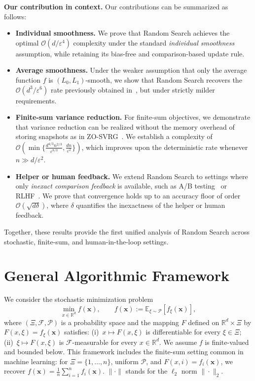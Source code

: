 \documentclass[twoside]{article}
\theoremstyle{plain}
\theoremstyle{definition}
\theoremstyle{remark}
\def\cO{{\mathcal{O}}}
\def\vx{{\bm{x}}}
\begin{document}
\textbf{Our contribution in context.}  
Our contributions can be summarized as follows:  
\begin{itemize}\setlength{\itemsep}{2pt}\setlength{\parskip}{0pt}\setlength{\parsep}{0pt}
    \item \textbf{Individual smoothness.}  
    We prove that Random Search achieves the optimal
    $\cO(d/\varepsilon^4)$ complexity under the standard
    \emph{individual smoothness} assumption, while retaining its bias-free and
    comparison-based update rule.
    \item \textbf{Average smoothness.}  
    Under the weaker assumption that only the average function $f$ is
    $(L_0,L_1)$-smooth, we show that Random Search recovers the
    $\cO(d^3/\varepsilon^6)$ rate previously obtained
    in~\cite{boucherouite2024mistp}, but under strictly milder requirements.  
    \item \textbf{Finite-sum variance reduction.}  
    For finite-sum objectives, we demonstrate that variance reduction can be
    realized without the memory overhead of storing snapshots as in
    ZO-SVRG~\cite{liu2018zeroth}. We establish a complexity of
    $\cO\!\left(\min\!\Big\{\tfrac{d^{4/3} n^{2/3}}{\varepsilon^{8/3}}, \tfrac{dn}{\varepsilon^2}\Big\}\right)$,
    which improves upon the deterministic rate whenever $n \gg d/\varepsilon^2$.
    \item \textbf{Helper or human feedback.}  
    We extend Random Search to settings where only \emph{inexact comparison
    feedback} is available, such as A/B testing~\cite{kohavi2009controlled} or
    RLHF~\cite{christiano2017deep,ouyang2022training}. We prove that convergence
    holds up to an accuracy floor of order $\cO(\sqrt{d \delta})$, where $\delta$
    quantifies the inexactness of the helper or human feedback.
\end{itemize}

Together, these results provide the first unified analysis of Random Search
across stochastic, finite-sum, and human-in-the-loop settings.

\section{General Algorithmic Framework}
We consider the stochastic minimization problem
\[
\min_{x \in \mathbb{R}^d} f(\vx), \qquad 
f(\vx) := \mathbb{E}_{\xi \sim \mathcal{P}}[f_{\xi}(\vx)],
\]
where $(\Xi,\mathcal{F},\mathcal{P})$ is a probability space and the mapping $F$ defined on $\mathbb{R}^d \times \Xi$ by $F(x,\xi)=f_{\xi}(\vx)$ satisfies:
(i)~$x \mapsto F(x,\xi)$ is differentiable for every $\xi \in \Xi$;
(ii)~$\xi \mapsto F(x,\xi)$ is $\mathcal{F}$-measurable for every $x \in \mathbb{R}^d$.
We assume $f$ is finite-valued and bounded below.  
This framework includes the finite-sum setting common in machine learning: for $\Xi = \{1,\dots,n\}$, uniform $\mathcal{P}$, and $F(x,i) = f_i(\vx)$, we recover $f(\vx) = \frac{1}{n}\sum_{i=1}^n f_i(\vx)$. $\|\cdot\|$ stands for the $\ell_2$ norm $\|\cdot\|_2$.
\end{document}
